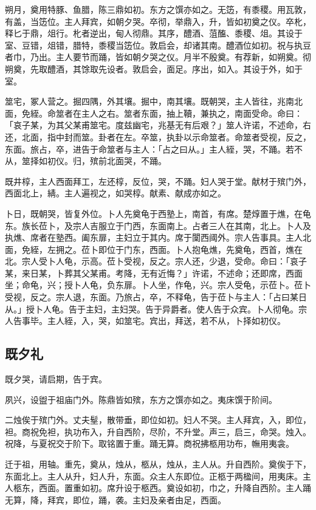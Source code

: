 \documentclass[]{article}
\begin{document}
朔月，奠用特豚、鱼腊，陈三鼎如初。东方之馔亦如之。无笾，有黍稷。用瓦敦，有盖，当笾位。主人拜宾，如朝夕哭。卒彻，举鼎入，升，皆如初奠之仪。卒朼，释匕于鼎，俎行。朼者逆出，甸人彻鼎。其序，醴酒、菹醢、黍稷、俎。其设于室、豆错，俎错，腊特，黍稷当笾位。敦启会，却诸其南。醴酒位如初。祝与执豆者巾，乃出。主人要节而踊，皆如朝夕哭之仪。月半不殷奠。有荐新，如朔奠。彻朔奠，先取醴酒，其馀取先设者。敦启会，面足。序出，如入。其设于外，如于室。

筮宅，冢人营之。掘四隅，外其壤。掘中，南其壤。既朝哭，主人皆往，兆南北面，免絰。命筮者在主人之右。筮者东面，抽上韇，兼执之，南面受命。命曰：「哀子某，为其父某甫筮宅。度兹幽宅，兆基无有后艰？」筮人许诺，不述命，右还，北面，指中封而筮。卦者在左。卒筮，执卦以示命筮者。命筮者受视，反之，东面。旅占，卒，进告于命筮者与主人：「占之曰从。」主人絰，哭，不踊。若不从，筮择如初仪。归，殡前北面哭，不踊。

既井椁，主人西面拜工，左还椁，反位，哭，不踊。妇人哭于堂。献材于殡门外，西面北上，綪。主人遍视之，如哭椁。献素、献成亦如之。

卜日，既朝哭，皆复外位。卜人先奠龟于西塾上，南首，有席。楚焞置于燋，在龟东。族长莅卜，及宗人吉服立于门西，东面南上。占者三人在其南，北上。卜人及执燋、席者在塾西。阖东扉，主妇立于其内。席于闑西阈外。宗人告事具。主人北面，免絰，左拥之。莅卜即位于门东，西面。卜人抱龟燋，先奠龟，西首，燋在北。宗人受卜人龟，示高。莅卜受视，反之。宗人还，少退，受命。命曰：「哀子某，来日某，卜葬其父某甫。考降，无有近悔？」许诺，不述命；还即席，西面坐；命龟，兴；授卜人龟，负东扉。卜人坐，作龟，兴。宗人受龟，示莅卜。莅卜受视，反之。宗人退，东面。乃旅占，卒，不释龟，告于莅卜与主人：「占曰某日从。」授卜人龟。告于主妇，主妇哭。告于异爵者。使人告于众宾。卜人彻龟。宗人告事毕。主人絰，入，哭，如筮宅。宾出，拜送，若不从，卜择如初仪。

\hypertarget{header-n60}{%
\subsection{既夕礼}\label{header-n60}}

既夕哭，请启期，告于宾。

夙兴，设盥于祖庙门外。陈鼎皆如殡，东方之馔亦如之。夷床馔于阶间。

二烛俟于殡门外。丈夫髽，散带垂，即位如初。妇人不哭。主人拜宾，入，即位，袒。商祝免袒，执功布入，升自西阶，尽阶，不升堂。声三，启三，命哭。烛入。祝降，与夏祝交于阶下。取铭置于重。踊无算。商祝拂柩用功布，幠用夷衾。

迁于祖，用轴。重先，奠从，烛从，柩从，烛从，主人从。升自西阶。奠俟于下，东面北上。主人从升，妇人升，东面。众主人东即位。正柩于两楹间，用夷床。主人柩东，西面。置重如初。席升设于柩西。奠设如初，巾之，升降自西阶。主人踊无算，降，拜宾，即位，踊，袭。主妇及亲者由足，西面。
\end{document}
